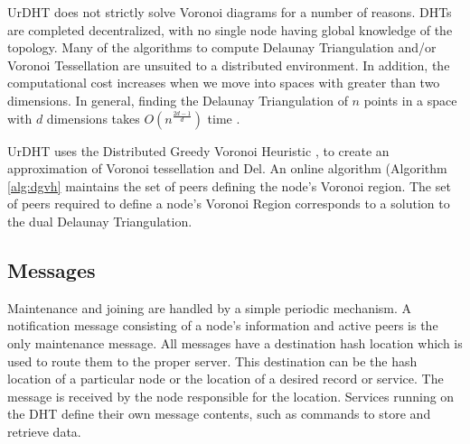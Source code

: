 UrDHT does not strictly solve Voronoi diagrams \cite{voronoi} for a number of reasons. 
DHTs are completed decentralized, with no single node having global knowledge of the topology.
Many of the algorithms to compute Delaunay Triangulation and/or Voronoi Tessellation are unsuited to a distributed environment.
In addition, the computational cost increases when we move into spaces with greater than two dimensions.
In general, finding the Delaunay Triangulation of $n$ points in a space with $d$ dimensions takes $O(n^{\frac{2d-1}{d}})$ time \cite{watson1981computing}.

UrDHT uses the Distributed Greedy Voronoi Heuristic \cite{dgvh}, to create an approximation of Voronoi tessellation and Del. 
An online algorithm (Algorithm \ref{alg:dgvh} maintains the set of peers defining the node's Voronoi region. The set of peers required to define a node's Voronoi Region corresponds to a solution to the dual Delaunay Triangulation.


%


\subsection{Messages}
Maintenance and joining are handled by a simple periodic mechanism. A notification message consisting of a node's information and active peers is the only maintenance message. All messages have a destination hash location which is used to route them to the proper server. This destination can be the hash location of a particular node or the location of a desired record or service.  The message is received by the node responsible for the location. Services running on the DHT define their own message contents, such as commands to store and retrieve data.

